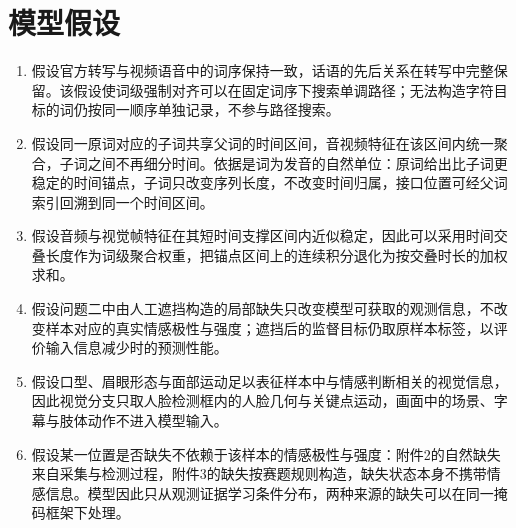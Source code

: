 \section{模型假设}

\begin{enumerate}[label=\arabic*.]
\item 假设官方转写与视频语音中的词序保持一致，话语的先后关系在转写中完整保留。该假设使词级强制对齐可以在固定词序下搜索单调路径；无法构造字符目标的词仍按同一顺序单独记录，不参与路径搜索。

\item 假设同一原词对应的子词共享父词的时间区间，音视频特征在该区间内统一聚合，子词之间不再细分时间。依据是词为发音的自然单位：原词给出比子词更稳定的时间锚点，子词只改变序列长度，不改变时间归属，接口位置可经父词索引回溯到同一个时间区间。

\item 假设音频与视觉帧特征在其短时间支撑区间内近似稳定，因此可以采用时间交叠长度作为词级聚合权重，把锚点区间上的连续积分退化为按交叠时长的加权求和。

\item 假设问题二中由人工遮挡构造的局部缺失只改变模型可获取的观测信息，不改变样本对应的真实情感极性与强度；遮挡后的监督目标仍取原样本标签，以评价输入信息减少时的预测性能。

\item 假设口型、眉眼形态与面部运动足以表征样本中与情感判断相关的视觉信息，因此视觉分支只取人脸检测框内的人脸几何与关键点运动，画面中的场景、字幕与肢体动作不进入模型输入。

\item 假设某一位置是否缺失不依赖于该样本的情感极性与强度：附件2的自然缺失来自采集与检测过程，附件3的缺失按赛题规则构造，缺失状态本身不携带情感信息。模型因此只从观测证据学习条件分布，两种来源的缺失可以在同一掩码框架下处理。
\end{enumerate}
